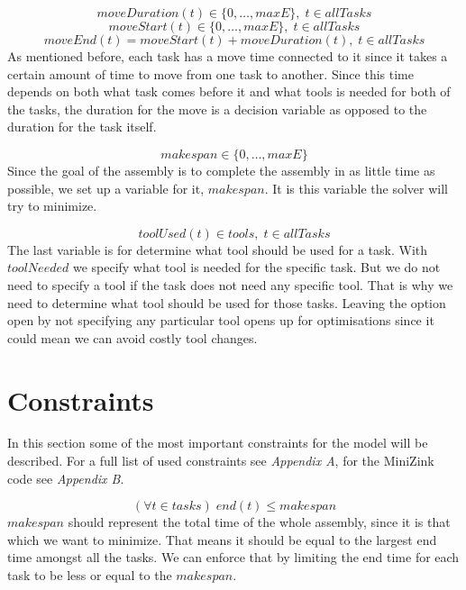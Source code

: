  \begin{equation}\label{eq:49}
 moveDuration(t) \in \{0 , \ldots , maxE\}, \; t \in allTasks
 \end{equation}
 \begin{equation}\label{eq:50}
 moveStart(t) \in \{0 , \ldots , maxE\}, \; t \in allTasks
 \end{equation}
 \begin{equation}\label{eq:51}
 moveEnd(t) = moveStart(t) + moveDuration(t), \; t \in allTasks
 \end{equation}
As mentioned before, each task has a move time connected to it since it takes a certain amount of time to move from one task to another. Since this time depends on both what task comes before it and what tools is needed for both of the tasks, the duration for the move is a decision variable as opposed to the duration for the task itself.
 
 \begin{equation}\label{eq:48}
 makespan \in \{0 , \ldots , maxE\}
 \end{equation}
Since the goal of the assembly is to complete the assembly in as little time as possible, we set up a variable for it, $makespan$. It is this variable the solver will try to minimize.
 
 \begin{equation}\label{eq:52}
 toolUsed(t) \in tools, \; t \in allTasks
 \end{equation}
The last variable is for determine what tool should be used for a task. With $toolNeeded$ we specify what tool is needed for the specific task. But we do not need to specify a tool if the task does not need any specific tool. That is why we need to determine what tool should be used for those tasks. Leaving the option open by not specifying any particular tool opens up for optimisations since it could mean we can avoid costly tool changes.
  
 
 \section{Constraints}\label{seq:constraints}
 In this section some of the most important constraints for the model will be described. For a full list of used constraints see \emph{Appendix A}, for the MiniZink code see \emph{Appendix B}.
 
 \begin{equation}\label{eq:92}
 (\forall t \in tasks) \; end(t) \le makespan
 \end{equation}
$makespan$ should represent the total time of the whole assembly, since it is that which we want to minimize. That means it should be equal to the largest end time amongst all the tasks. We can enforce that by limiting the end time for each task to be less or equal to the $makespan$.
 
